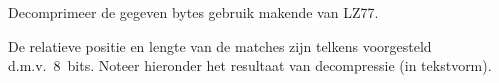\begin{question}
  Decomprimeer de gegeven bytes gebruik makende van LZ77.
  \begin{center}
  \end{center}
  De relatieve positie en lengte van de matches zijn telkens voorgesteld d.m.v.~8~bits.
  Noteer hieronder het resultaat van decompressie (in tekstvorm).
  \vskip5mm
  \begin{center}
  \end{center}
\end{question}
